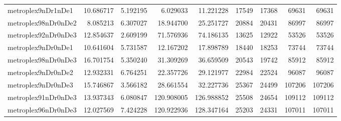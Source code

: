 \begin{longtable}{|l|r|r|r|r|r|r|r|r|}
metroplex9nDr1nDe1 & 10.686717 & 5.192195 & 6.029033 & 11.221228 & 17549 & 17368 & 69631 & 69631 \\
metroplex98nDr0nDe2 & 8.085213 & 6.307027 & 18.944700 & 25.251727 & 20884 & 20431 & 86997 & 86997 \\
metroplex92nDr0nDe3 & 12.854637 & 2.609199 & 71.576936 & 74.186135 & 13625 & 12922 & 53526 & 53526 \\
metroplex9nDr0nDe1 & 10.641604 & 5.731587 & 12.167202 & 17.898789 & 18440 & 18253 & 73744 & 73744 \\
metroplex98nDr0nDe3 & 16.701754 & 5.350240 & 31.309269 & 36.659509 & 20543 & 19742 & 85912 & 85912 \\
metroplex9nDr0nDe2 & 12.932331 & 6.764251 & 22.357726 & 29.121977 & 22984 & 22524 & 96087 & 96087 \\
metroplex9nDr0nDe3 & 15.746867 & 3.566182 & 28.661554 & 32.227736 & 25367 & 24499 & 107206 & 107206 \\
metroplex91nDr0nDe3 & 13.937343 & 6.080847 & 120.908005 & 126.988852 & 25508 & 24654 & 109112 & 109112 \\
metroplex96nDr0nDe3 & 12.027569 & 7.424228 & 120.922936 & 128.347164 & 25203 & 24331 & 107011 & 107011 \\
\end{longtable}
